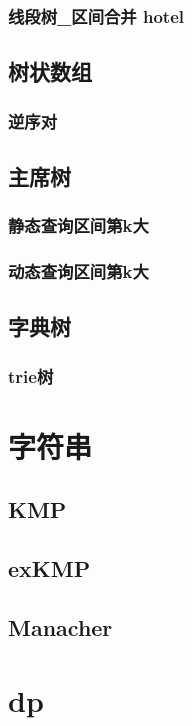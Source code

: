 \documentclass[10pt,a4paper]{article}
\begin{document}
\subsubsection{线段树\_区间合并 hotel}

\subsection{树状数组}
\subsubsection{逆序对}

\subsection{主席树}
\subsubsection{静态查询区间第k大}

\subsubsection{动态查询区间第k大}

\subsection{字典树}
\subsubsection{trie树}

\section{字符串}
\subsection{KMP}

\subsection{exKMP}

\subsection{Manacher}

\section{dp}
\end{document}
